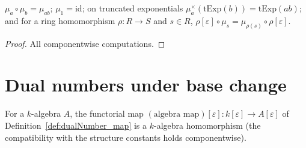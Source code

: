\begin{lemma}
  \label{lem:mumford_scaling_props}
  \leanok
  \(\mu_a \circ \mu_b = \mu_{ab}\); \(\mu_1 = \mathrm{id}\); on truncated exponentials
  \(\mu_a^\times(\mathrm{tExp}(b)) = \mathrm{tExp}(ab)\); and for a ring homomorphism
  \(\rho : R \to S\) and \(s \in R\),
  \(\rho[\varepsilon] \circ \mu_s = \mu_{\rho(s)} \circ \rho[\varepsilon]\).
\end{lemma}
\begin{proof}
  \leanok
  All componentwise computations.
\end{proof}

\section{Dual numbers under base change}

\begin{definition}
  \label{def:dualNumber_mapAlgHom}
  \leanok
  For a \(k\)-algebra \(A\), the functorial map
  \((\text{algebra map})[\varepsilon] : k[\varepsilon] \to A[\varepsilon]\) of
  Definition~\ref{def:dualNumber_map} is a \(k\)-algebra homomorphism (the
  compatibility with the structure constants holds componentwise).
\end{definition}

